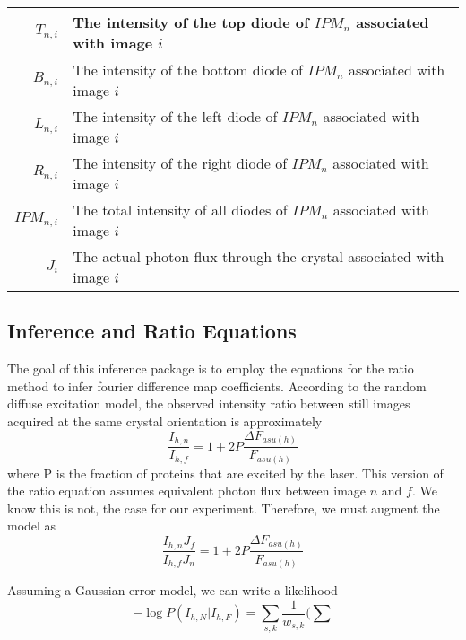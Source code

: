 \documentclass{report}
\begin{document}
\begin{center}
\begin{tabular}{r | p{}}
$T_{n,i}$ & The intensity of the top diode of $IPM_n$ associated with image $i$ \\ \hline
$B_{n,i}$ & The intensity of the bottom diode of $IPM_n$ associated with image $i$ \\ \hline
$L_{n,i}$ & The intensity of the left diode of $IPM_n$ associated with image $i$ \\ \hline
$R_{n,i}$ & The intensity of the right diode of $IPM_n$ associated with image $i$ \\ \hline
$IPM_{n,i}$ & The total intensity of all diodes of $IPM_n$ associated with image $i$ \\ \hline
$J_i$ & The actual photon flux through the crystal associated with image $i$ \\ 
\end{tabular} 
\end{center}

\subsection{Inference and Ratio Equations}
The goal of this inference package is to employ the equations for the ratio method \cite{coppens} to infer fourier difference map coefficients. 
According to the random diffuse excitation model, the observed intensity ratio between still images acquired at the same crystal orientation is approximately
\begin{equation}
\frac{I_{h,n}}{I_{h,f}} =  1 + 2P\frac{\Delta F_{asu(h)}} {F_{asu(h)}}
\end{equation}
where P is the fraction of proteins that are excited by the laser. 
This version of the ratio equation assumes equivalent photon flux between image $n$ and $f$. 
We know this is not, the case for our experiment.
Therefore, we must augment the model as
\begin{equation}
\frac{I_{h,n}J_f}{I_{h,f}J_n} =  1 + 2P\frac{\Delta F_{asu(h)}} {F_{asu(h)}}
\end{equation}

Assuming a Gaussian error model, we can write a likelihood
\begin{equation}
-\log P(I_{h,N} | I_{h,F}) = \sum_{s,k} \frac{1}{w_{s,k}} (\sum
\end{equation}
\end{document}
